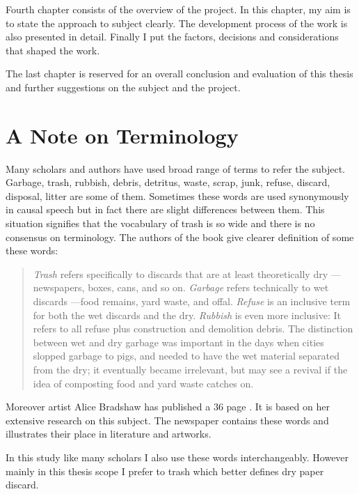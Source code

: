 Fourth chapter consists of the overview of the project. In this chapter, my aim is to state the approach to subject clearly. The development process of the work is also presented in detail. Finally I put the factors, decisions and considerations that shaped the work.

The last chapter is reserved for an overall conclusion and evaluation of this thesis and further suggestions on the subject and the project.



\section{A Note on Terminology}
Many scholars and authors have used broad range of terms to refer the subject. Garbage, trash, rubbish, debris, detritus, waste, scrap, junk, refuse, discard, disposal, litter are some of them. Sometimes these words are used synonymously in causal speech but in fact there are slight differences between them. This situation signifies that the vocabulary of trash is so wide and there is no consensus on terminology. The authors of the book  give clearer definition of some these words:

\begin{quote}
\textit{Trash} refers specifically to discards that are at least theoretically dry ---newspapers, boxes, cans, and so on. \textit{Garbage} refers technically to wet discards ---food remains, yard waste, and offal. \textit{Refuse} is an inclusive term for both the wet discards and the dry. \textit{Rubbish} is even more inclusive: It refers to all refuse plus construction and demolition debris. The distinction between wet and dry garbage was important in the days when cities slopped garbage to pigs, and needed to have the wet material separated from the dry; it eventually became irrelevant, but may see a revival if the idea of composting food and yard waste catches on. \citep[9]{rathje1992rubbish}
\end{quote}

Moreover artist Alice Bradshaw has published a 36 page . It is based on her extensive research on this subject. The newspaper contains these words and illustrates their place in literature and artworks.

In this study like many scholars I also use these words interchangeably. However mainly in this thesis scope I prefer to trash which better defines dry paper discard.

